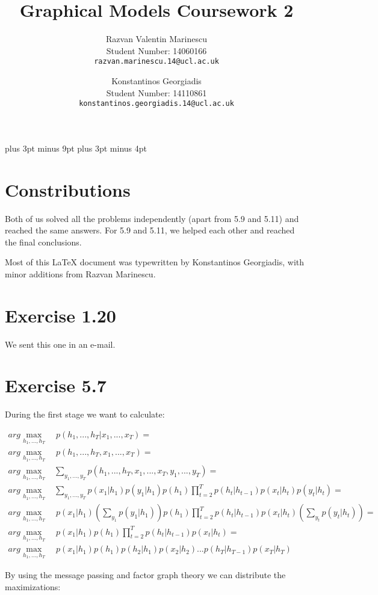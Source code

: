 \documentclass[11pt,a4paper,oneside]{report}
\title{Graphical Models Coursework 2}
\author{
Razvan Valentin Marinescu\\
Student Number: 14060166\\
\texttt{razvan.marinescu.14@ucl.ac.uk}
\and
Konstantinos Georgiadis\\
Student Number: 14110861\\
\texttt{konstantinos.georgiadis.14@ucl.ac.uk}
}
\begin{document}
\belowdisplayskip=12pt plus 3pt minus 9pt
\belowdisplayshortskip=7pt plus 3pt minus 4pt
\maketitle{}

\section{Constributions}

Both of us solved all the problems independently (apart from 5.9 and 5.11) and reached the same answers. For 5.9 and 5.11, we helped each other and reached the final conclusions. 

Most of this \LaTeX \: document was typewritten by Konstantinos Georgiadis, with minor additions from Razvan Marinescu.

\section*{Exercise 1.20}

	We sent this one in an e-mail.

\section*{Exercise 5.7}

During the first stage we want to calculate:	

\begin{align*}
arg\max_{h_1,...,h_T}&\ p(h_1,...,h_T|x_1,...,x_T)=\\
arg\max_{h_1,...,h_T}&\ p(h_1,...,h_T,x_1,...,x_T)=\\
arg\max_{h_1,...,h_T}&\sum_{y_1,...,y_T}p(h_1,...,h_T,x_1,...,x_T,y_1,...,y_T)=\\		
arg\max_{h_1,...,h_T}&\sum_{y_1,...,y_T}p(x_1|h_1)p(y_1|h_1)p(h_1)\prod_{t=2}^Tp(h_t|h_{t-1})p(x_t|h_t)p(y_t|h_t)=\\	
arg\max_{h_1,...,h_T}&\ p(x_1|h_1)\left(\sum_{y_1}p(y_1|h_1)\right)p(h_1)\prod_{t=2}^Tp(h_t|h_{t-1})p(x_t|h_t)\left(\sum_{y_t}p(y_t|h_t)\right)=\\	
arg\max_{h_1,...,h_T}&\ p(x_1|h_1)p(h_1)\prod_{t=2}^Tp(h_t|h_{t-1})p(x_t|h_t)=\\		
arg\max_{h_1,...,h_T}&\ p(x_1|h_1)p(h_1)p(h_2|h_1)p(x_2|h_2)...p(h_T|h_{T-1})p(x_T|h_T)			
\end{align*}

By using the message passing and factor graph theory we can distribute the maximizations:
\end{document}
